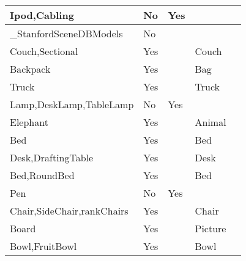 \documentclass{article}
\begin{document}
\begin{longtable}{|l|l|l|l|l|}
Ipod,Cabling                             & No               & Yes                            &                &                             \\ \hline
\_StanfordSceneDBModels                  & No               &                                &                &                             \\ \hline
Couch,Sectional                          & Yes              &                                & Couch          &                             \\ \hline
Backpack                                 & Yes              &                                & Bag            &                             \\ \hline
Truck                                    & Yes              &                                & Truck          &                             \\ \hline
Lamp,DeskLamp,TableLamp                  & No               & Yes                            &                &                             \\ \hline
Elephant                                 & Yes              &                                & Animal         &                             \\ \hline
Bed                                      & Yes              &                                & Bed            &                             \\ \hline
Desk,DraftingTable                       & Yes              &                                & Desk           &                             \\ \hline
Bed,RoundBed                             & Yes              &                                & Bed            &                             \\ \hline
Pen                                      & No               & Yes                            &                &                             \\ \hline
Chair,SideChair,rankChairs               & Yes              &                                & Chair          &                             \\ \hline
Board                                    & Yes              &                                & Picture        &                             \\ \hline
Bowl,FruitBowl                           & Yes              &                                & Bowl           &                             \\ \hline

\end{longtable}
\end{document}
